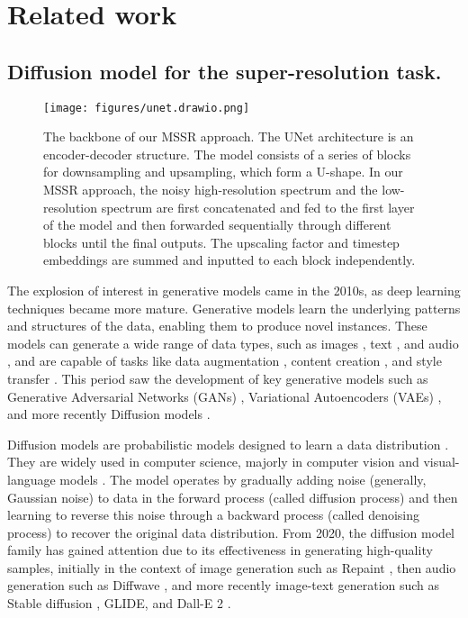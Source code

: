 \section{Related work}
\subsection{Diffusion model for the super-resolution task.}
\begin{figure*}[tb]
    \centering
    \texttt{[image: figures/unet.drawio.png]}
    \caption{The backbone of our MSSR approach. The UNet architecture \cite{unet,AttentionUnet} is an encoder-decoder structure. 
    The model consists of a series of blocks for downsampling and upsampling, which form a U-shape.  In our MSSR approach, the noisy high-resolution spectrum and the low-resolution spectrum are first concatenated and fed to the first layer of the model and then forwarded sequentially through different blocks until the final outputs. The upscaling factor and timestep embeddings are summed and inputted to each block independently.}
    \label{fig:unet}
\end{figure*}

The explosion of interest in generative models came in the 2010s, as deep learning techniques became more mature. 
Generative models learn the underlying patterns and structures of the data, enabling them to produce novel instances. These models can generate a wide range of data types, such as images \cite{ganimation,yan2023combining,imga}, text \cite{bert,touvron2023llama}, and audio \cite{van2016wavenet,diffusion-audio}, and are capable of tasks like data augmentation \cite{sr3,srdiff}, content creation \cite{touvron2023llama}, and style transfer \cite{karras2019style}.
This period saw the development of key generative models such as Generative Adversarial Networks (GANs) \cite{gan}, Variational Autoencoders (VAEs) \cite{vae}, and more recently Diffusion models \cite{ddpm}.


Diffusion models are probabilistic models designed to learn a data distribution \cite{ddpm}. 
They are widely used in computer science, majorly in computer vision and visual-language models \cite{clip}.
The model operates by gradually adding noise (generally, Gaussian noise) to data in the forward process (called diffusion process) and then learning to reverse this noise through a backward process (called denoising process) to recover the original data distribution.
From 2020, the diffusion model family has gained attention due to its effectiveness in generating high-quality samples, initially in the context of image generation such as Repaint \cite{repaint}, then audio generation such as Diffwave \cite{diffusion-audio}, and more recently image-text generation such as Stable diffusion \cite{ldm}, GLIDE\cite{glide}, and Dall-E 2 \cite{dalle2}.


